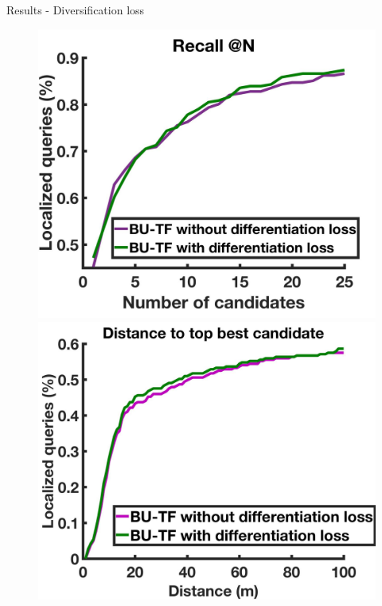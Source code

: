\begin{frame}{Results - Diversification loss}
	\begin{figure}[t]
		\centering %
		\includegraphics[width=0.499\linewidth]{images/diffloss_res/recall2.jpg}\hfill
		\includegraphics[width=0.499\linewidth]{images/diffloss_res/dist2.jpg}
	\end{figure}	
\end{frame}

